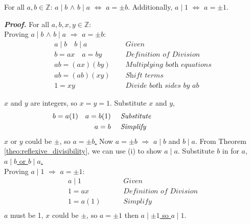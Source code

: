 \newpage

\begin {theo}

\label{theo:reflexive_divisibility}

For all $a, b \in \mathbb{Z}$: $a \mid b$ $\land$ $b \mid a$ $\Longleftrightarrow$ $a = \pm b$. Additionally, $a \mid 1$ $\Longleftrightarrow$ $a = \pm 1$.
\end{theo}

\begin{Proof}

    \label{proof:reflexive_divisibility}

    \textit{\textbf{Proof.}} For all $a, b, x,y \in \mathbb{Z}$:\\

    \noindent
    Proving $a\mid b$ $\land$ $b\mid a$ $\Longrightarrow$ $a = \pm b$:
    \begin{align*}
        a\mid b \quad b\mid a \quad \quad & \textit{ Given}                      \\
        b = ax \quad a = by         \quad & \textit{ Definition of Division}     \\
        ab = (ax) (by)              \quad & \textit{ Multiplying both equations} \\
        ab = (ab)(xy)               \quad & \textit{ Shift terms}                \\
        1 = xy                      \quad & \textit{ Divide both sides by } ab
    \end{align*}

    \noindent
    $x$ and $y$ are integers, so $x = y = 1$. Substitute $x$ and $y$,
    \hspace{-3em}
    \begin{align*}
        b = a(1) \quad a = b(1) \quad & \textit{ Substitute}              \\
        a = b \quad                   & \textit{ Simplify } \hspace*{9em}
    \end{align*}
    $x$ or $y$ could be $\pm$, so \underline{$a = \pm b$.} Now $a=\pm b$ $\Longrightarrow$ $a\mid b$ and $b\mid a$.
    From Theorem \autoref{theo:reflexive_divisibility}, we can use (i) to show $a\mid a$. Substitute $b$ in for $a$, \underline{$a\mid b$ or $b\mid a$.}\\

    \noindent
    Proving $a\mid 1$ $\Longrightarrow$ $a = \pm 1$:
    \begin{align*}
        a\mid 1 \quad \quad  & \textit{ Given}                  \\
        1 = ax \quad \quad   & \textit{ Definition of Division} \\
        1 = a(1) \quad \quad & \textit{ Simplify}               \\
    \end{align*}
    $a$ must be 1, $x$ could be $\pm$, so $a = \pm 1$ then \underline{$a\mid \pm 1$ so $a\mid 1$}.
\end{Proof}

